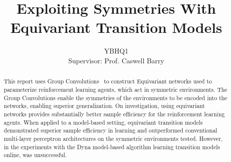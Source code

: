 
\title{Exploiting Symmetries With Equivariant Transition Models}
\author{YBHQ1\\Supervisor: Prof. Caswell Barry}

\maketitle

\begin{abstract} %
	This report uses Group Convolutions~\cite{cohen2016group} to construct Equivariant networks used to parameterize reinforcement learning agents, which act in symmetric environments. The Group Convolutions enable the symmetries of the environments to be encoded into the networks, enabling superior generalization. On investigation, using equivariant networks provides substantially better sample efficiency for the reinforcement learning agents. When applied to a model-based setting, equivariant transition models demonstrated superior sample efficiency in learning and outperformed conventional multi-layer perceptron architectures on the symmetric environments tested. However, in the experiments with the Dyna model-based algorithm learning transition models online, was unsuccessful.
\end{abstract}


\setcounter{tocdepth}{2}

\tableofcontents
\listoffigures
\listoftables

